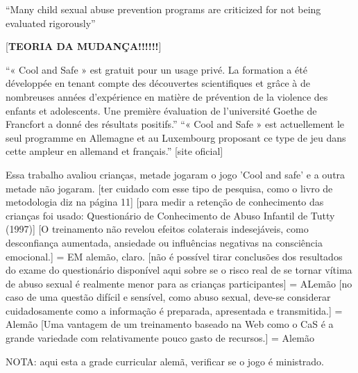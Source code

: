 ``Many child sexual abuse prevention programs are criticized for not being evaluated rigorously''\cite{dip2016advancing}



[\textbf{TEORIA DA MUDANÇA!!!!!!}]

``« Cool and Safe » est gratuit pour un usage privé. La formation a été développée en tenant compte des découvertes scientifiques et grâce à de nombreuses années d'expérience en matière de prévention de la violence des enfants et adolescents. Une première évaluation de l'université Goethe de Francfort a donné des résultats positifs.'' ``« Cool and Safe » est actuellement le seul programme en Allemagne et au Luxembourg proposant ce type de jeu dans cette ampleur en allemand et français.'' [site oficial]

Essa trabalho avaliou crianças, metade jogaram o jogo 'Cool and safe' e a outra metade não jogaram. \cite{fingerleabschlussbericht} [ter cuidado com esse tipo de pesquisa, como o livro de metodologia diz na página 11]
[para medir a retenção de conhecimento das crianças foi usado: Questionário de Conhecimento de Abuso Infantil de Tutty (1997)]
[O treinamento não revelou efeitos colaterais indesejáveis, como desconfiança aumentada, ansiedade ou influências negativas na consciência emocional.] = EM alemão, claro.
[não é possível tirar conclusões dos resultados do exame do questionário disponível aqui sobre se o risco real de se tornar vítima de abuso sexual é realmente menor para as crianças participantes] = ALemão
[no caso de uma questão difícil e sensível, como abuso sexual, deve-se considerar cuidadosamente como a informação é preparada, apresentada e transmitida.] = Alemão
[Uma vantagem de um treinamento baseado na Web como o CaS é a grande variedade com relativamente pouco gasto de recursos.] = Alemão

NOTA: aqui esta a grade curricular alemã, verificar se o jogo é ministrado.





